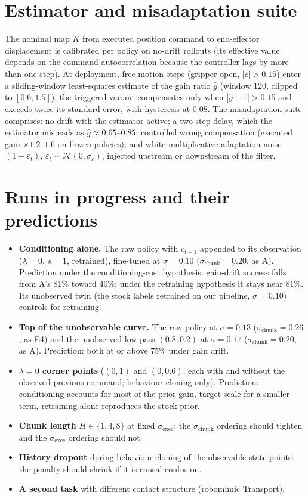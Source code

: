 \documentclass{article}
\newcommand{\sexec}{\sigma_{\mathrm{exec}}}
\newcommand{\schunk}{\sigma_{\mathrm{chunk}}}
\begin{document}
\section{Estimator and misadaptation suite}
\label{app:estimator}
The nominal map $K$ from executed position command to end-effector displacement is calibrated per policy on no-drift rollouts (its effective value depends on the command autocorrelation because the controller lags by more than one step). At deployment, free-motion steps (gripper open, $|c|>0.15$) enter a sliding-window least-squares estimate of the gain ratio $\hat g$ (window 120, clipped to $[0.6,1.5]$); the triggered variant compensates only when $|\hat g-1|>0.15$ and exceeds twice its standard error, with hysteresis at $0.08$. The misadaptation suite comprises: no drift with the estimator active; a two-step delay, which the estimator misreads as $\hat g\approx0.65$--$0.85$; controlled wrong compensation (executed gain $\times1.2$--$1.6$ on frozen policies); and white multiplicative adaptation noise $(1+\varepsilon_t)$, $\varepsilon_t\sim\mathcal N(0,\sigma_\varepsilon)$, injected upstream or downstream of the filter.

\section{Runs in progress and their predictions}
\label{app:planned}
\begin{itemize}
\item \textbf{Conditioning alone.} The raw policy with $c_{t-1}$ appended to its observation ($\lambda=0$, $s=1$, retrained), fine-tuned at $\sigma=0.10$ ($\schunk=0.20$, as A). Prediction under the conditioning-cost hypothesis: gain-drift success falls from A's 81\% toward 40\%; under the retraining hypothesis it stays near 81\%. Its unobserved twin (the stock labels retrained on our pipeline, $\sigma=0.10$) controls for retraining.
\item \textbf{Top of the unobservable curve.} The raw policy at $\sigma=0.13$ ($\schunk=0.26$, as E4) and the unobserved low-pass $(0.8,0.2)$ at $\sigma=0.17$ ($\schunk=0.20$, as A). Prediction: both at or above 75\% under gain drift.
\item \textbf{$\lambda=0$ corner points} ($(0,1)$ and $(0,0.6)$, each with and without the observed previous command; behaviour cloning only). Prediction: conditioning accounts for most of the prior gain, target scale for a smaller term, retraining alone reproduces the stock prior.
\item \textbf{Chunk length} $H\in\{1,4,8\}$ at fixed $\sexec$: the $\schunk$ ordering should tighten and the $\sexec$ ordering should not.
\item \textbf{History dropout} during behaviour cloning of the observable-state points: the penalty should shrink if it is causal confusion.
\item \textbf{A second task} with different contact structure (robomimic Transport).
\end{itemize}
\end{document}
